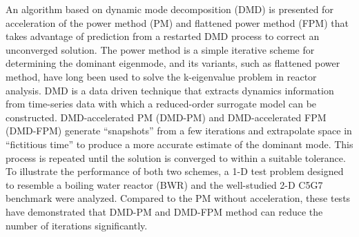 
\pagestyle{empty}
\setlength{\baselineskip}{0.8cm}



An algorithm based on dynamic mode decomposition (DMD) is presented for acceleration of the power method (PM) and flattened power method (FPM) that takes advantage of prediction from a restarted DMD process to correct an unconverged solution.
The power method is a simple iterative scheme for determining the dominant eigenmode, and its variants, such as flattened power method, have long been used to solve the k-eigenvalue problem in reactor analysis.
DMD is a data driven technique that extracts dynamics information from time-series data with which a reduced-order surrogate model can be constructed.
DMD-accelerated PM (DMD-PM) and DMD-accelerated FPM (DMD-FPM) generate ``snapshots'' from a few iterations and extrapolate space in ``fictitious time'' to produce a more accurate estimate of the dominant mode.  
This process is repeated until the solution is converged to within a suitable tolerance.
To illustrate the performance of both two schemes, a 1-D test problem designed to resemble a boiling water reactor (BWR) and the well-studied 2-D C5G7 benchmark were analyzed.
Compared to the PM without acceleration, these tests have demonstrated that DMD-PM and DMD-FPM method can reduce the number of iterations significantly.


